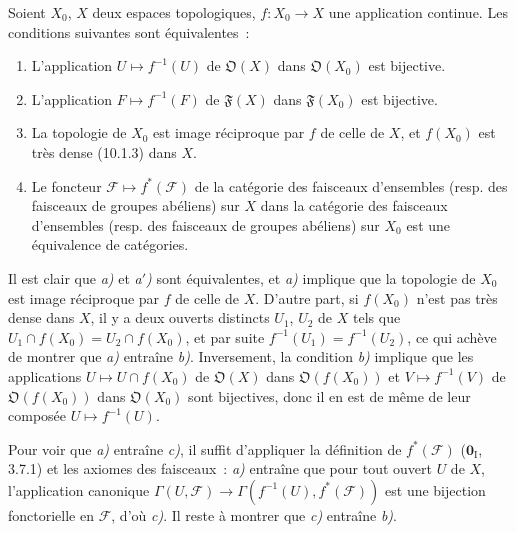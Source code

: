 \begin{proposition}[10.2.1]
Soient $X_0$, $X$ deux espaces topologiques, $f:X_0\to X$ une application
continue. Les conditions suivantes sont équivalentes~:
\begin{enumerate}[label=\emph{\alph*)}]
  \item L'application $U\mapsto f^{-1}(U)$ de $\mathfrak O(X)$ dans
  $\mathfrak O(X_0)$ est bijective.
  \item[\emph{a$'$)}] L'application $F\mapsto f^{-1}(F)$ de $\mathfrak F(X)$
  dans $\mathfrak F(X_0)$ est bijective.
  \item La topologie de $X_0$ est image réciproque par $f$ de celle de $X$, et
  $f(X_0)$ est très dense (10.1.3) dans $X$.
  \item Le foncteur $\mathcal F\mapsto f^*(\mathcal F)$ de la catégorie des
  faisceaux d'ensembles (resp. des faisceaux de groupes abéliens) sur $X$ dans
  la catégorie des faisceaux d'ensembles (resp. des faisceaux de groupes
  abéliens) sur $X_0$ est une équivalence de catégories.
\end{enumerate}
\end{proposition}

Il est clair que \emph{a)} et \emph{a$'$)} sont équivalentes, et \emph{a)}
implique que la topologie de $X_0$ est image réciproque par $f$ de celle de
$X$. D'autre part, si $f(X_0)$ n'est pas très dense dans $X$, il y a deux
ouverts distincts $U_1$, $U_2$ de $X$ tels que
$U_1\cap f(X_0)=U_2\cap f(X_0)$, et par suite
$f^{-1}(U_1)=f^{-1}(U_2)$, ce qui achève de montrer que \emph{a)} entraîne
\emph{b)}. Inversement, la condition \emph{b)} implique que les applications
$U\mapsto U\cap f(X_0)$ de $\mathfrak O(X)$ dans $\mathfrak O(f(X_0))$ et
$V\mapsto f^{-1}(V)$ de $\mathfrak O(f(X_0))$ dans $\mathfrak O(X_0)$ sont
bijectives, donc il en est de même de leur composée $U\mapsto f^{-1}(U)$.

Pour voir que \emph{a)} entraîne \emph{c)}, il suffit d'appliquer la définition
de $f^*(\mathcal F)$ ($\mathbf 0_{\mathrm I}$, 3.7.1) et les axiomes des
faisceaux~: \emph{a)} entraîne que pour tout ouvert $U$ de $X$, l'application
canonique
$\Gamma(U,\mathcal F)\to\Gamma(f^{-1}(U),f^*(\mathcal F))$ est une bijection
fonctorielle en $\mathcal F$, d'où \emph{c)}. Il reste à montrer que
\emph{c)} entraîne \emph{b)}.

